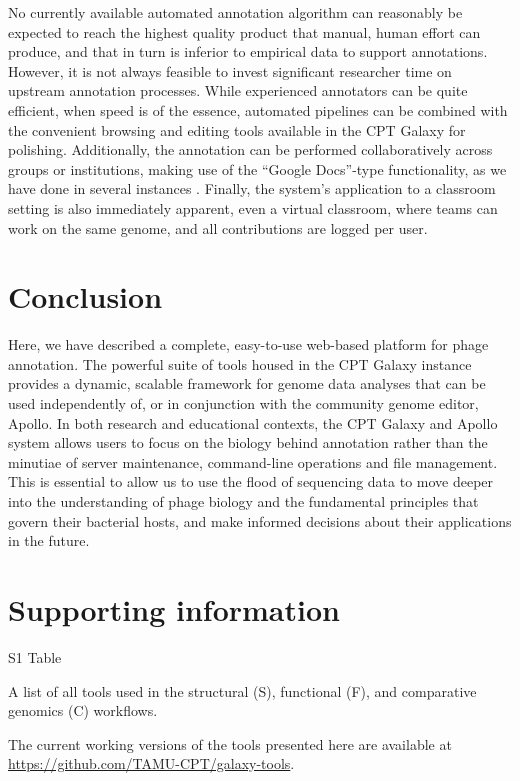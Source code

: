 No currently available automated annotation algorithm can reasonably be
expected to reach the highest quality product that manual, human effort
can produce, and that in turn is inferior to empirical data to support
annotations. However, it is not always feasible to invest significant
researcher time on upstream annotation processes. While experienced
annotators can be quite efficient, when speed is of the essence,
automated pipelines can be combined with the convenient browsing and
editing tools available in the CPT Galaxy for polishing. Additionally,
the annotation can be performed collaboratively across groups or
institutions, making use of the ``Google Docs''-type functionality, as
we have done in several instances \cite{Marc_2019,Culbertson_2019,Freeman_2019}. Finally, the system's
application to a classroom setting is also immediately apparent, even a
virtual classroom, where teams can work on the same genome, and all
contributions are logged per user.

\section*{Conclusion}

Here, we have described a complete, easy-to-use web-based platform for
phage annotation. The powerful suite of tools housed in the CPT Galaxy
instance provides a dynamic, scalable framework for genome data analyses
that can be used independently of, or in conjunction with the community
genome editor, Apollo. In both research and educational contexts, the
CPT Galaxy and Apollo system allows users to focus on the biology behind
annotation rather than the minutiae of server maintenance, command-line
operations and file management. This is essential to allow us to use the
flood of sequencing data to move deeper into the understanding of phage
biology and the fundamental principles that govern their bacterial
hosts, and make informed decisions about their applications in the
future.

\section*{Supporting information}

S1 Table

A list of all tools used in the structural (S), functional (F), and
comparative genomics (C) workflows.

The current working versions of the tools presented here are available
at \url{https://github.com/TAMU-CPT/galaxy-tools}.

